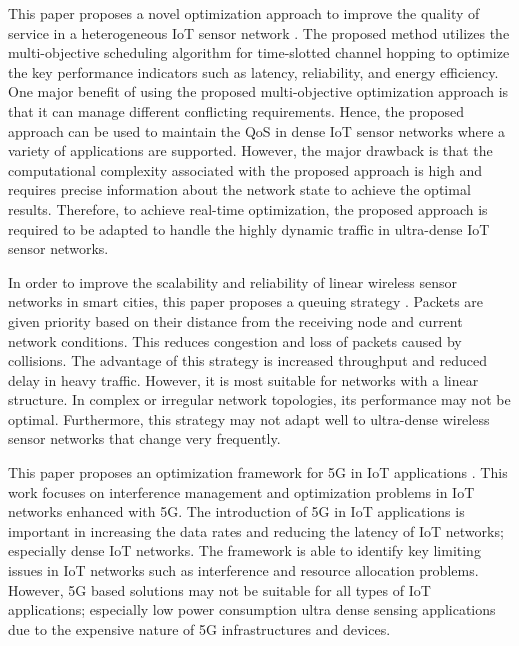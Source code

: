 \documentclass[a4paper,fleqn]{cas-dc}
\numberwithin{equation}{section}
\begin{document}
This paper proposes a novel optimization approach to improve the quality of service in a heterogeneous IoT sensor network \cite{Vatankhah2024}. The proposed method utilizes the multi-objective scheduling algorithm for time-slotted channel hopping to optimize the key performance indicators such as latency, reliability, and energy efficiency. One major benefit of using the proposed multi-objective optimization approach is that it can manage different conflicting requirements. Hence, the proposed approach can be used to maintain the QoS in dense IoT sensor networks where a variety of applications are supported. However, the major drawback is that the computational complexity associated with the proposed approach is high and requires precise information about the network state to achieve the optimal results. Therefore, to achieve real-time optimization, the proposed approach is required to be adapted to handle the highly dynamic traffic in ultra-dense IoT sensor networks.

In order to improve the scalability and reliability of linear wireless sensor networks in smart cities, this paper proposes a queuing strategy \cite{Villordo-Jimenez2024}. Packets are given priority based on their distance from the receiving node and current network conditions. This reduces congestion and loss of packets caused by collisions. The advantage of this strategy is increased throughput and reduced delay in heavy traffic. However, it is most suitable for networks with a linear structure. In complex or irregular network topologies, its performance may not be optimal. Furthermore, this strategy may not adapt well to ultra-dense wireless sensor networks that change very frequently.

This paper proposes an optimization framework for 5G in IoT applications \cite{Pons2023}. This work focuses on interference management and optimization problems in IoT networks enhanced with 5G. The introduction of 5G in IoT applications is important in increasing the data rates and reducing the latency of IoT networks; especially dense IoT networks. The framework is able to identify key limiting issues in IoT networks such as interference and resource allocation problems. However, 5G based solutions may not be suitable for all types of IoT applications; especially low power consumption ultra dense sensing applications due to the expensive nature of 5G infrastructures and devices.
\end{document}
